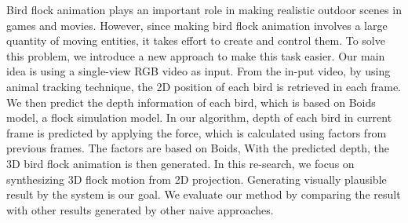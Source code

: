 Bird flock animation plays an important role in making realistic outdoor scenes in games and movies. However, since making bird flock animation involves a large quantity of moving entities, it takes effort to create and control them. To solve this problem, we introduce a new approach to make this task easier. Our main idea is using a single-view RGB video as input.  From the in-put video, by using animal tracking technique, the 2D position of each bird is retrieved in each frame. We then predict the depth information of each bird, which is based on Boids model, a flock simulation model. In our algorithm, depth of each bird in current frame is predicted by applying the force, which is calculated using factors from previous frames. The factors are based on Boids, With the predicted depth, the 3D bird flock animation is then generated. In this re-search, we focus on synthesizing 3D flock motion from 2D projection. Generating visually plausible result by the system is our goal. We evaluate our method by comparing the result with other results generated by other naive approaches.

